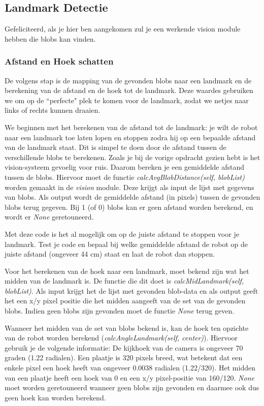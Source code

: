 \documentclass[a4paper, twoside]{article}
\begin{document}
\subsection{Landmark Detectie}
Gefeliciteerd, als je hier ben aangekomen zul je een werkende vision module hebben die blobs kan vinden.

\subsubsection{Afstand en Hoek schatten}
De volgens stap is de mapping van de gevonden blobs naar een landmark en de berekening van de afstand en de hoek tot de landmark. Deze waardes gebruiken we om op de ``perfecte" plek te komen voor de landmark, zodat we netjes naar links of rechts kunnen draaien.

We beginnen met het berekenen van de afstand tot de landmark: je wilt de robot naar een landmark toe laten lopen en stoppen zodra hij op een bepaalde afstand van de landmark staat. Dit is simpel te doen door de afstand tussen de verschillende blobs te berekenen. Zoals je bij de vorige opdracht gezien hebt is het vision-systeem gevoelig voor ruis. Daarom bereken je een gemiddelde afstand tussen de blobs. Hiervoor moet de functie \textit{calcAvgBlobDistance(self, blobList)} worden gemaakt in de \textit{vision} module. Deze krijgt als input de lijst met gegevens van blobs. Als output wordt de gemiddelde afstand (in pixels) tussen de gevonden blobs terug gegeven. Bij 1 (of 0) blobs kan er geen afstand worden berekend, en wordt er \textit{None} geretouneerd.

Met deze code is het al mogelijk om op de juiste afstand te stoppen voor je landmark. Test je code en bepaal bij welke gemiddelde afstand de robot op de juiste afstand (ongeveer 44 cm) staat en laat de robot dan stoppen.

Voor het berekenen van de hoek naar een landmark, moet bekend zijn wat het midden van de landmark is. De functie die dit doet is \textit{calcMidLandmark(self, blobList)}. Als input krijgt het de lijst met gevonden blob-data en als output geeft het een x/y pixel positie die het midden aangeeft van de set van de gevonden blobs. Indien geen blobs zijn gevonden moet de functie \textit{None} terug geven.

Wanneer het midden van de set van blobs bekend is, kan de hoek ten opzichte van de robot worden berekend (\textit{calcAngleLandmark(self, center)}). Hiervoor gebruik je de volgende informatie:
De kijkhoek van de camera is ongeveer 70 graden (1.22 radialen). Een plaatje is 320 pixels breed, wat betekent dat een enkele pixel een hoek heeft van ongeveer 0.0038 radialen (1.22/320). Het midden van een plaatje heeft een hoek van 0 en een x/y pixel-positie van 160/120. \textit{None} moet worden geretouneerd wanneer geen blobs zijn gevonden en daarmee ook dus geen hoek kan worden berekend.
\end{document}
